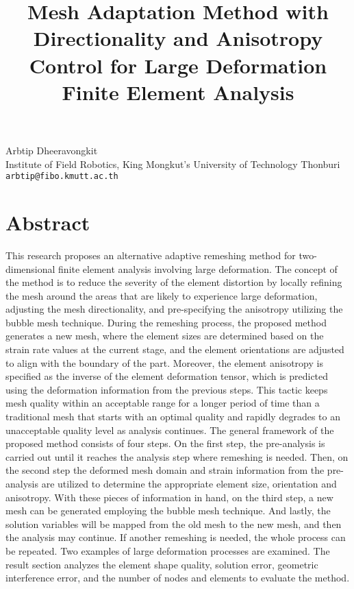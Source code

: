 \title{Mesh Adaptation Method with Directionality and Anisotropy Control for Large Deformation Finite Element Analysis}
\author{}  \institute{}
\maketitle
\begin{center}
{\large Arbtip Dheeravongkit}\\
Institute of Field Robotics, King Mongkut's University of Technology Thonburi\\
{\tt arbtip@fibo.kmutt.ac.th}

\end{center}

\section*{Abstract}

This research proposes an alternative adaptive remeshing method for two-dimensional finite element analysis involving large deformation. The concept of the method is to reduce the severity of the element distortion by locally refining the mesh around the areas that are likely to experience large deformation, adjusting the mesh directionality, and pre-specifying the anisotropy utilizing the bubble mesh technique. During the remeshing process, the proposed method generates a new mesh, where the element sizes are determined based on the strain rate values at the current stage, and the element orientations are adjusted to align with the boundary of the part. Moreover, the element anisotropy is specified as the inverse of the element deformation tensor, which is predicted using the deformation information from the previous steps. This tactic keeps mesh quality within an acceptable range for a longer period of time than a traditional mesh that starts with an optimal quality and rapidly degrades to an unacceptable quality level as analysis continues. The general framework of the proposed method consists of four steps. On the first step, the pre-analysis is carried out until it reaches the analysis step where remeshing is needed. Then, on the second step the deformed mesh domain and strain information from the pre-analysis are utilized to determine the appropriate element size, orientation and anisotropy. With these pieces of information in hand,  on the third step, a new mesh can be generated employing the bubble mesh technique. And lastly, the solution variables will be mapped from the old mesh to the new mesh, and then the analysis may continue. If another remeshing is needed, the whole process can be repeated. Two examples of large deformation processes are examined. The result section analyzes the element shape quality, solution error, geometric interference error, and the number of nodes and elements to evaluate the method.

